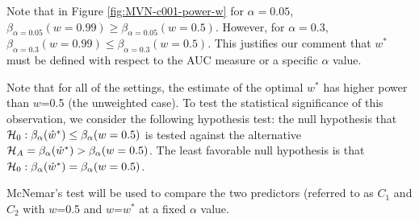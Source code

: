 \documentclass[12pt,oneside,final]{thesis}\usepackage[]{graphicx}\usepackage[]{color}
\begin{document}
Note that in Figure \ref{fig:MVN-c001-power-w} for $\alpha=0.05$, $\beta_{\alpha=0.05}(w=0.99)\geq\beta_{\alpha=0.05}(w=0.5)$. However, for $\alpha=0.3$, $\beta_{\alpha=0.3}(w=0.99)\leq\beta_{\alpha=0.3}(w=0.5)$. This justifies our comment that  $w^{*}$  must be defined with respect to  the AUC measure or a specific $\alpha$ value.

Note that  for all of the settings, the estimate of the optimal $w^{*}$ has  higher power than $w$=0.5 (the unweighted case).
To test the statistical significance of this observation, we consider the following hypothesis test:  the null hypothesis that  $\mathcal{H}_{0}: \beta_{\alpha}({\hat{w}^*})\leq\beta_{\alpha}({w=0.5})$  is tested against the alternative $\mathcal{H}_{A}=\beta_{\alpha}({\hat{w}^*})>\beta_{\alpha}({w=0.5})$.  The least favorable null hypothesis is that  $\mathcal{H}_{0}: \beta_{\alpha}({\hat{w}^*})=\beta_{\alpha}({w=0.5})$.


McNemar's test will be used to compare the two predictors (referred to as $C_1$ and $C_2$ with $w$=0.5 and $w$=$w^*$ at a fixed $\alpha$ value.
\end{document}
